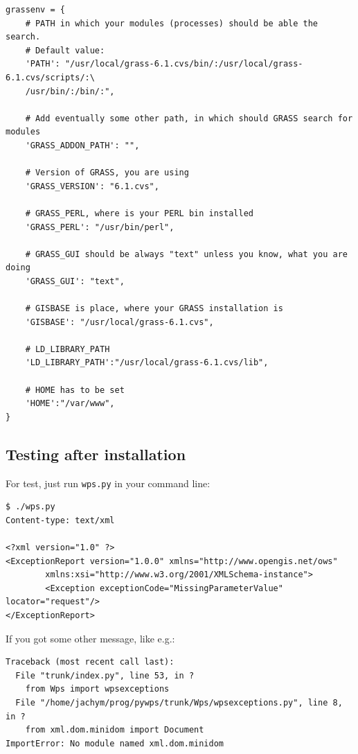 \documentclass[a4paper,11pt]{article}
\begin{document}
\begin{verbatim}
grassenv = {
    # PATH in which your modules (processes) should be able the search.
    # Default value:
    'PATH': "/usr/local/grass-6.1.cvs/bin/:/usr/local/grass-6.1.cvs/scripts/:\
    /usr/bin/:/bin/:",
    
    # Add eventually some other path, in which should GRASS search for modules
    'GRASS_ADDON_PATH': "",
    
    # Version of GRASS, you are using
    'GRASS_VERSION': "6.1.cvs",
    
    # GRASS_PERL, where is your PERL bin installed
    'GRASS_PERL': "/usr/bin/perl",
    
    # GRASS_GUI should be always "text" unless you know, what you are doing
    'GRASS_GUI': "text",
    
    # GISBASE is place, where your GRASS installation is
    'GISBASE': "/usr/local/grass-6.1.cvs",
    
    # LD_LIBRARY_PATH
    'LD_LIBRARY_PATH':"/usr/local/grass-6.1.cvs/lib",
    
    # HOME has to be set
    'HOME':"/var/www",
}
\end{verbatim}



\subsection{Testing after installation}
\label{testing}
For test, just run
\texttt{wps.py} in your command line:
    
\begin{verbatim}
$ ./wps.py
Content-type: text/xml

<?xml version="1.0" ?>
<ExceptionReport version="1.0.0" xmlns="http://www.opengis.net/ows" 
        xmlns:xsi="http://www.w3.org/2001/XMLSchema-instance">
        <Exception exceptionCode="MissingParameterValue" locator="request"/>
</ExceptionReport>
    \end{verbatim}

     
If you got some other message, like e.g.:
     

    \begin{verbatim}
Traceback (most recent call last):
  File "trunk/index.py", line 53, in ?
    from Wps import wpsexceptions
  File "/home/jachym/prog/pywps/trunk/Wps/wpsexceptions.py", line 8, in ?
    from xml.dom.minidom import Document
ImportError: No module named xml.dom.minidom
    \end{verbatim}
\end{document}
